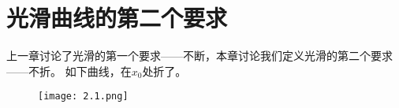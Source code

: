 \section{光滑曲线的第二个要求}

上一章讨论了光滑的第一个要求——不断，本章讨论我们定义光滑的第二个要求——不折。
如下曲线，在$x_0$处折了。

\begin{figure}[h]
\centering
\texttt{[image: 2.1.png]}
\end{figure}





